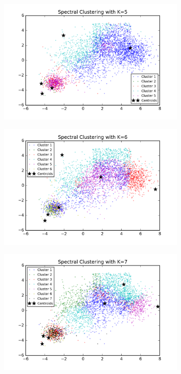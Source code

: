 \begin{description}
\begin{description}
\begin{figure}[!h]
\begin{subfigure}[b]{0.475\textwidth}
            \includegraphics[width=\textwidth]{./figures/bigClustering_spectral_5.png}
        \end{subfigure}
        \hfill
        \begin{subfigure}[b]{0.475\textwidth}   
            \centering 
            \includegraphics[width=\textwidth]{./figures/bigClustering_spectral_6.png}
        \end{subfigure}
        \begin{subfigure}[b]{0.475\textwidth}   
            \centering 
            \includegraphics[width=\textwidth]{./figures/bigClustering_spectral_7.png}

\end{subfigure}
\end{figure}
\end{description}
\end{description}
